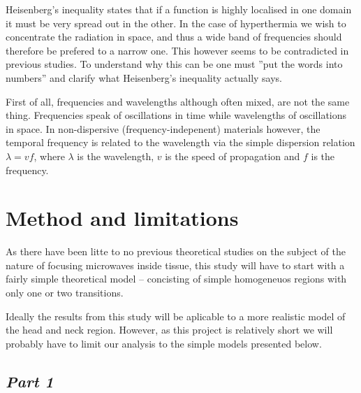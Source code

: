 \documentclass[11pt,a4paper, 
english, swedish %
]{article}
\begin{document}
Heisenberg's inequality states that if a function is highly localised in one domain it must be very spread out in the other. In the case of hyperthermia we wish to concentrate the radiation in space, and thus a wide band of frequencies should therefore be prefered to a narrow one. This however seems to be contradicted in previous studies. 
To understand why this can be one must ''put the words into numbers'' and clarify what Heisenberg's inequality actually says. 

First of all, frequencies and wavelengths although often mixed, are not the same thing. Frequencies speak of oscillations in time while wavelengths of oscillations in space. 
In non-dispersive (frequency-indepenent) materials however, the temporal frequency is related to the wavelength via the simple dispersion relation $\lambda=vf$, where $\lambda$ is the wavelength, $v$ is the speed of propagation and $f$ is the frequency. 







\section{Method and limitations}
As there have been litte to no previous theoretical studies on the subject of the nature of focusing microwaves inside tissue, this study will have to start with a fairly simple theoretical model -- concisting of simple homogeneuos regions with only one or two transitions.  

Ideally the results from this study will be aplicable to a more realistic model of the head and neck region.
However, as this project is relatively short we will probably have to limit our analysis to the simple models presented below.  

\subsection{\textit{Part 1}}
\end{document}
